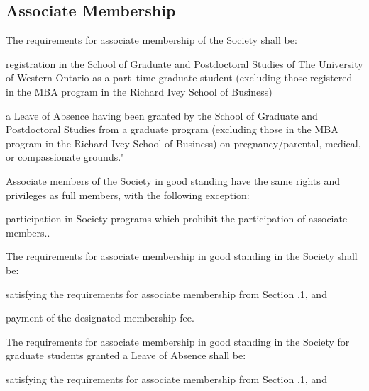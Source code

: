 \subsection{Associate Membership}
	\begin{longenum}[label*=\thesubsection.\arabic*., align=left]
  	\item  The requirements for associate membership of the Society shall be:
    	\begin{longenum}[label*=\arabic*., align=left]
    	\item registration in the School of Graduate and Postdoctoral Studies of The University of Western Ontario as a part--time graduate student (excluding those registered in the MBA program in the Richard Ivey School of Business) 
        \item a Leave of Absence having been granted by the School of Graduate and Postdoctoral Studies from a graduate program (excluding those in the MBA program in the Richard Ivey School of Business) on pregnancy/parental, medical, or compassionate grounds."
  	\end{longenum}
    \item Associate members of the Society in good standing have the same rights and privileges as full members, with the following exception:
    	\begin{longenum}[label*=\arabic*., align=left]
    	\item participation in Society programs which prohibit the participation of associate members..
  	\end{longenum}
    \item The requirements for associate membership in good standing in the Society shall be:
    \begin{longenum}[label*=\arabic*., align=left]
    	\item satisfying the requirements for associate membership from Section .1, and
        \item payment of the designated membership fee.
  	\end{longenum}
    \item  The requirements for associate membership in good standing in the Society for graduate students granted a Leave of Absence shall be:
        \begin{longenum}[label*=\arabic*., align=left]
    	\item satisfying the requirements for associate membership from Section .1, and

  	\end{longenum}
\end{longenum}

